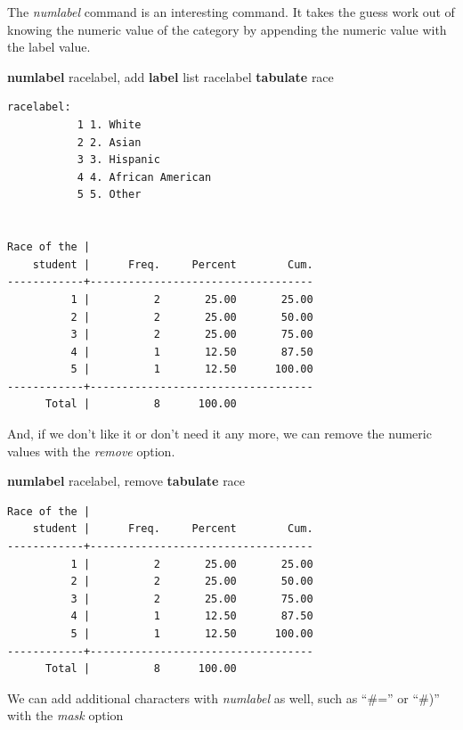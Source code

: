 \documentclass[
]{book}
\newenvironment{Shaded}{\begin{snugshade}}{\end{snugshade}}
\newcommand{\KeywordTok}[1]{\textcolor[rgb]{0.13,0.29,0.53}{\textbf{#1}}}
\newcommand{\NormalTok}[1]{#1}
\newcommand{\OtherTok}[1]{\textcolor[rgb]{0.56,0.35,0.01}{#1}}
\begin{document}
The \emph{numlabel} command is an interesting command. It takes the guess work out of knowing the numeric value of the category by appending the numeric value with the label value.

\begin{Shaded}
\begin{Highlighting}[]
\KeywordTok{numlabel}\NormalTok{ racelabel, add}
\KeywordTok{label} \OtherTok{list}\NormalTok{ racelabel}
\KeywordTok{tabulate}\NormalTok{ race}
\end{Highlighting}
\end{Shaded}

\begin{verbatim}
racelabel:
           1 1. White
           2 2. Asian
           3 3. Hispanic
           4 4. African American
           5 5. Other


Race of the |
    student |      Freq.     Percent        Cum.
------------+-----------------------------------
          1 |          2       25.00       25.00
          2 |          2       25.00       50.00
          3 |          2       25.00       75.00
          4 |          1       12.50       87.50
          5 |          1       12.50      100.00
------------+-----------------------------------
      Total |          8      100.00
\end{verbatim}

And, if we don't like it or don't need it any more, we can remove the numeric values with the \emph{remove} option.

\begin{Shaded}
\begin{Highlighting}[]
\KeywordTok{numlabel}\NormalTok{ racelabel, remove}
\KeywordTok{tabulate}\NormalTok{ race}
\end{Highlighting}
\end{Shaded}

\begin{verbatim}
Race of the |
    student |      Freq.     Percent        Cum.
------------+-----------------------------------
          1 |          2       25.00       25.00
          2 |          2       25.00       50.00
          3 |          2       25.00       75.00
          4 |          1       12.50       87.50
          5 |          1       12.50      100.00
------------+-----------------------------------
      Total |          8      100.00
\end{verbatim}

We can add additional characters with \emph{numlabel} as well, such as ``\#='' or ``\#)'' with the \emph{mask} option
\end{document}
